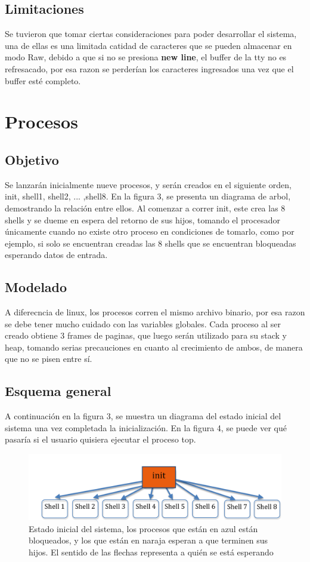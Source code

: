 \documentclass[10pt,a4paper]{article}
\begin{document}
	\subsection{Limitaciones}
		Se tuvieron que tomar ciertas consideraciones para poder desarrollar el sistema, una de ellas es una limitada catidad de caracteres que se pueden almacenar en modo Raw, debido a que si no se presiona \textbf{new line}, el buffer de la tty no es refresacado, por esa razon se perder\'ian los caracteres ingresados una vez que el buffer est\'e completo.
\section{Procesos}
	\subsection{Objetivo}
	Se lanzar\'an inicialmente nueve procesos, y ser\'an creados en el siguiente orden, init, shell1, shell2, ... ,shell8. En la figura 3, se presenta un diagrama de arbol, demostrando la relaci\'on entre ellos. Al comenzar a correr init, este crea las 8 shells y se dueme en espera del retorno de sus hijos, tomando el procesador \'unicamente cuando no existe otro proceso en condiciones de tomarlo, como por ejemplo, si solo se encuentran creadas las 8 shells que se encuentran bloqueadas esperando datos de entrada.
	\subsection{Modelado}
	A diferecncia de linux, los procesos corren el mismo archivo binario, por esa razon se debe tener mucho cuidado con las variables globales. Cada proceso al ser creado obtiene 3 frames de paginas, que luego ser\'an utilizado para su stack y heap, tomando serias precauciones en cuanto al crecimiento de ambos, de manera que no se pisen entre s\'i. 
	\subsection{Esquema general}
	A continuaci\'on en la figura 3,  se muestra un diagrama del estado inicial del sistema una vez completada la inicializaci\'on. En la figura 4, se puede ver qu\'e pasar\'ia si el usuario quisiera ejecutar el proceso top.
	
		\begin{figure}
	\begin{center} 
	\includegraphics[angle=0, width=1\textwidth ]{procesos.png} 
	\caption{ Estado inicial del sistema, los procesos que est\'an en azul est\'an bloqueados, y los que est\'an en naraja esperan a que terminen sus hijos. El sentido de las flechas representa a qui\'en se est\'a esperando }
	\end{center} 
	\end{figure}
	
\end{document}
